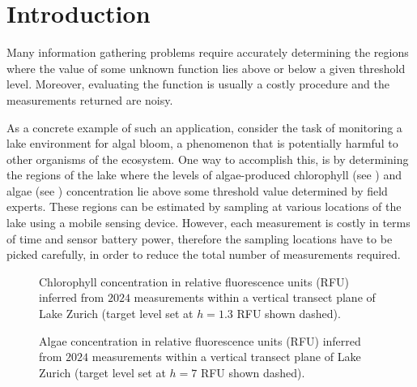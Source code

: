 \chapter{Introduction}
Many information gathering problems 
require accurately determining the regions where the value of some
unknown function lies above or below a given threshold level.
Moreover, evaluating the function is usually a costly
procedure and the measurements returned are noisy.

As a concrete example of such an application, consider the task of
monitoring a lake environment for algal bloom, a phenomenon that is
potentially harmful to other organisms of the ecosystem. One way to
accomplish this, is by
determining the regions of the lake where the levels of algae-produced
chlorophyll (see ) and
algae (see ) concentration lie above some threshold
value determined by field experts.
These regions can be estimated by sampling
at various locations of the lake using a mobile sensing device.
However, each measurement is costly in terms of time and sensor battery power,
therefore the sampling locations have to be picked carefully, in order to
reduce the total number of measurements required.

%
\begin{figure}[b]
  \centering
  \caption{Chlorophyll concentration in relative fluorescence units (RFU)
           inferred from $2024$ measurements within a vertical transect plane
           of Lake Zurich (target level set at $h = 1.3$ RFU shown dashed).}
  \label{fig:limno_chl}
\end{figure}

%
\begin{figure}[t]
  \centering
  \hspace{-0.7em}
  \caption{Algae concentration in relative fluorescence units (RFU)
           inferred from $2024$ measurements within a vertical transect plane
           of Lake Zurich (target level set at $h = 7$ RFU shown dashed).}
  \label{fig:limno_bgape}
\end{figure}

